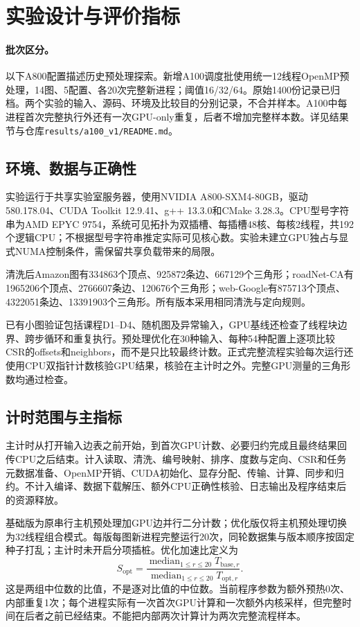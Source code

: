 \section{实验设计与评价指标}

\paragraph{批次区分。}以下A800配置描述历史预处理探索。新增A100调度批使用统一12线程OpenMP预处理，14图、5配置、各20次完整新进程；阈值16/32/64。原始1400份记录已归档。两个实验的输入、源码、环境及比较目的分别记录，不合并样本。A100中每进程首次完整执行外还有一次GPU-only重复，后者不增加完整样本数。详见结果节与仓库\texttt{results/a100\_v1/README.md}。
\subsection{环境、数据与正确性}
实验运行于共享实验室服务器，使用NVIDIA A800-SXM4-80GB，驱动580.178.04、CUDA Toolkit 12.9.41、g++ 13.3.0和CMake 3.28.3。CPU型号字符串为AMD EPYC 9754，系统可见拓扑为双插槽、每插槽48核、每核2线程，共192个逻辑CPU；不根据型号字符串推定实际可见核心数。实验未建立GPU独占与显式NUMA控制条件，需保留共享负载带来的局限。

清洗后Amazon图有334863个顶点、925872条边、667129个三角形；roadNet-CA有1965206个顶点、2766607条边、120676个三角形；web-Google有875713个顶点、4322051条边、13391903个三角形。所有版本采用相同清洗与定向规则。

已有小图验证包括课程D1--D4、随机图及异常输入，GPU基线还检查了线程块边界、跨步循环和重复执行。预处理优化在30种输入、每种54种配置上逐项比较CSR的offsets和neighbors，而不是只比较最终计数。正式完整流程实验每次运行还使用CPU双指针计数核验GPU结果，核验在主计时之外。完整GPU测量的三角形数均通过检查。

\subsection{计时范围与主指标}
主计时从打开输入边表之前开始，到首次GPU计数、必要归约完成且最终结果回传CPU之后结束。计入读取、清洗、编号映射、排序、度数与定向、CSR和任务元数据准备、OpenMP开销、CUDA初始化、显存分配、传输、计算、同步和归约。不计入编译、数据下载解压、额外CPU正确性核验、日志输出及程序结束后的资源释放。

基础版为原串行主机预处理加GPU边并行二分计数；优化版仅将主机预处理切换为32线程组合模式。每版每图新进程完整运行20次，同轮数据集与版本顺序按固定种子打乱；主计时未开启分项插桩。优化加速比定义为
\begin{equation}
S_{\mathrm{opt}}=\frac{\operatorname{median}_{1\le r\le20}T_{\mathrm{base},r}}
{\operatorname{median}_{1\le r\le20}T_{\mathrm{opt},r}}.
\end{equation}
这是两组中位数的比值，不是逐对比值的中位数。当前程序参数为额外预热0次、内部重复1次；每个进程实际有一次首次GPU计算和一次额外内核采样，但完整时间在后者之前已经结束。不能把内部两次计算计为两次完整流程样本。

